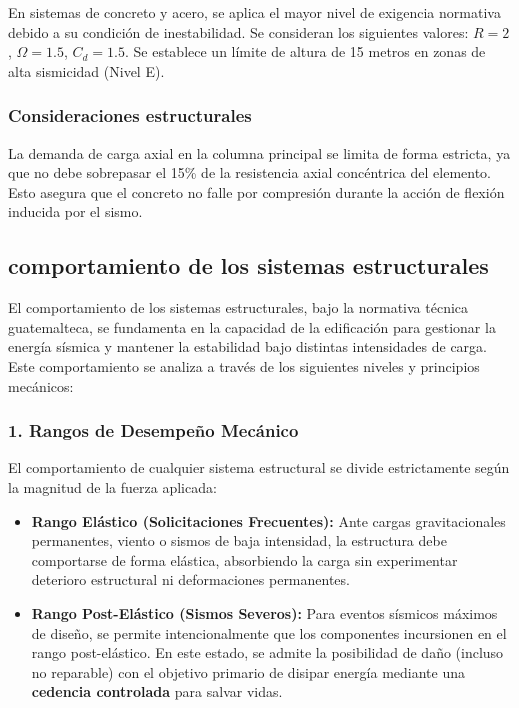 \documentclass[14pt,letterpaper]{extarticle}
\begin{document}
	En sistemas de concreto y acero, se aplica el mayor nivel de exigencia normativa debido a su condición de inestabilidad. Se consideran los siguientes valores: $R = 2$, $\Omega = 1.5$, $C_d = 1.5$. Se establece un límite de altura de 15 metros en zonas de alta sismicidad (Nivel E).
	
	\subsubsection{Consideraciones estructurales}
	
	La demanda de carga axial en la columna principal se limita de forma estricta, ya que no debe sobrepasar el 15\% de la resistencia axial concéntrica del elemento. Esto asegura que el concreto no falle por compresión durante la acción de flexión inducida por el sismo.
	
	












	

	\subsection{comportamiento de los sistemas estructurales}
	
	El comportamiento de los sistemas estructurales, bajo la normativa técnica guatemalteca, se fundamenta en la capacidad de la edificación para gestionar la energía sísmica y mantener la estabilidad bajo distintas intensidades de carga. Este comportamiento se analiza a través de los siguientes niveles y principios mecánicos:
	
	\subsubsection{1. Rangos de Desempeño Mecánico}
	
	El comportamiento de cualquier sistema estructural se divide estrictamente según la magnitud de la fuerza aplicada:
	
	\begin{itemize}
		\item \textbf{Rango Elástico (Solicitaciones Frecuentes):} Ante cargas gravitacionales permanentes, viento o sismos de baja intensidad, la estructura debe comportarse de forma elástica, absorbiendo la carga sin experimentar deterioro estructural ni deformaciones permanentes.
		
		\item \textbf{Rango Post-Elástico (Sismos Severos):} Para eventos sísmicos máximos de diseño, se permite intencionalmente que los componentes incursionen en el rango post-elástico. En este estado, se admite la posibilidad de daño (incluso no reparable) con el objetivo primario de disipar energía mediante una \textbf{cedencia controlada} para salvar vidas.
	\end{itemize}
	
\end{document}

